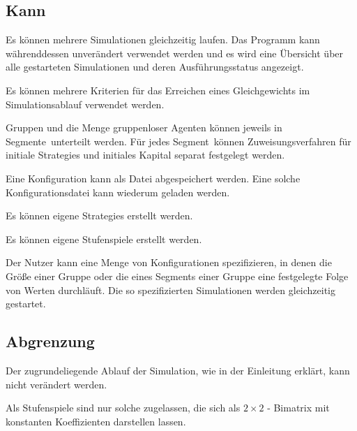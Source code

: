 \documentclass[parskip=full,11pt]{scrartcl}
\def\segment{Segment}
\def\segments{Segmente}
\begin{document}
\subsection{Kann}

Es können mehrere Simulationen gleichzeitig laufen. Das Programm kann währenddessen unverändert verwendet werden und es wird eine Übersicht über alle gestarteten Simulationen und deren Ausführungsstatus angezeigt.

Es können mehrere Kriterien für das Erreichen eines Gleichgewichts im Simulationsablauf verwendet werden.

Gruppen und die Menge gruppenloser Agenten können jeweils in \segments\ unterteilt werden. Für jedes \segment\ können Zuweisungsverfahren für initiale \Glspl{Strategie} und initiales Kapital separat festgelegt werden.

Eine Konfiguration kann als Datei abgespeichert werden. Eine solche Konfigurationsdatei kann wiederum geladen werden.

Es können eigene \Glspl{Strategie} erstellt werden.

Es können eigene Stufenspiele erstellt werden.

Der \Gls{Nutzer} kann eine Menge von Konfigurationen spezifizieren, in denen die Größe einer Gruppe oder die eines \segment s einer Gruppe eine festgelegte Folge von Werten durchläuft. Die so spezifizierten Simulationen werden gleichzeitig gestartet.

\subsection{Abgrenzung}

Der zugrundeliegende Ablauf der Simulation, wie in der Einleitung erklärt, kann nicht verändert werden.

Als Stufenspiele sind nur solche zugelassen, die sich als \(2 \times 2\) - Bimatrix mit konstanten Koeffizienten darstellen lassen.
\end{document}
